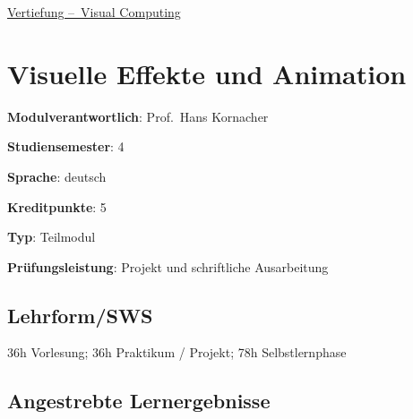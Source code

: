 \hyperref[/mi-2017/modulbeschreibungen-bachelor/BA_Vertiefung-Visual-Computing]{Vertiefung – Visual Computing}

\hypertarget{visuelle-effekte-und-animationpathlabelmi-2017modulbeschreibungen-bachelorba_vc-visuelle-effekte-und-animation}{%
\chapter{Visuelle Effekte und
Animation\label{/mi-2017/modulbeschreibungen-bachelor/BA_VC-visuelle-effekte-und-animation}}\label{visuelle-effekte-und-animationpathlabelmi-2017modulbeschreibungen-bachelorba_vc-visuelle-effekte-und-animation}}

\begin{modulHead}
\textbf{Modulverantwortlich}: Prof.~Hans
Kornacher
\end{modulHead}
\begin{modulHead}
\textbf{Studiensemester}:
4
\end{modulHead}
\begin{modulHead}
\textbf{Sprache}:
deutsch
\end{modulHead}
\begin{modulHead}
\textbf{Kreditpunkte}:
5
\end{modulHead}
\begin{modulHead}
\textbf{Typ}:
Teilmodul
\end{modulHead}
\begin{modulHead}
\textbf{Prüfungsleistung}:
Projekt und schriftliche Ausarbeitung
\end{modulHead}


\hypertarget{lehrformswspathlabelmi-2017modulbeschreibungen-bachelorba_vc-visuelle-effekte-und-animation}{%
\section*{Lehrform/SWS\label{/mi-2017/modulbeschreibungen-bachelor/BA_VC-visuelle-effekte-und-animation}}\label{lehrformswspathlabelmi-2017modulbeschreibungen-bachelorba_vc-visuelle-effekte-und-animation}}

36h Vorlesung; 36h Praktikum / Projekt; 78h Selbstlernphase

\hypertarget{angestrebte-lernergebnissepathlabelmi-2017modulbeschreibungen-bachelorba_vc-visuelle-effekte-und-animation}{%
\section*{Angestrebte
Lernergebnisse\label{/mi-2017/modulbeschreibungen-bachelor/BA_VC-visuelle-effekte-und-animation}}\label{angestrebte-lernergebnissepathlabelmi-2017modulbeschreibungen-bachelorba_vc-visuelle-effekte-und-animation}}

